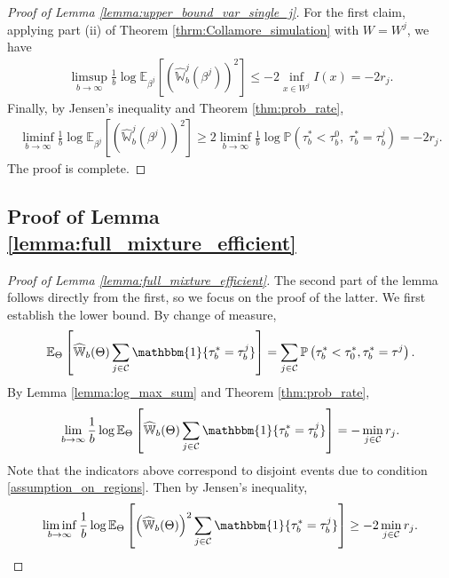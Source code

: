 \documentclass[aap,preprint]{imsart}
\newcommand{\Pro}{{\mathbb{P}}}
\newcommand{\Exp}{{\mathbb{E}}}
\theoremstyle{plain}
\theoremstyle{definition}
\begin{document}
\begin{appendix}
\begin{proof}[Proof of Lemma \ref{lemma:upper_bound_var_single_j}]
For the first claim, applying part (ii) of Theorem \ref{thrm:Collamore_simulation} with $W = W^j$, we have
\begin{align*}
    \limsup_{b \to \infty} \frac{1}{b} \log \Exp_{\beta^j}\left[ 
\left(\widehat{\mathbb{W}}_{b}^{j}(\beta^j)\right)^2
\right]  \leq -2 \inf_{x \in W^j} I(x) = -2r_j.
\end{align*}
Finally, by Jensen's inequality and Theorem \ref{thm:prob_rate},
\begin{align*}
    \liminf_{b \to \infty} \frac{1}{b} \log \Exp_{\beta^j}\left[ 
\left(\widehat{\mathbb{W}}_{b}^{j}(\beta^j)\right)^2
\right]  \geq  2 \liminf_{b \to \infty}   \frac{1}{b} \log \Pro\left(\tau_b^* < \tau_b^0,\; \tau_b^* = \tau_b^j \right) = -2 r_j.
\end{align*}
The proof is complete.
\end{proof}

\subsection{Proof of Lemma \ref{lemma:full_mixture_efficient}}\label{app:proof_full_mixture}
\begin{proof}[Proof of Lemma \ref{lemma:full_mixture_efficient}]
The second part of the lemma follows directly from the first, so we focus on the proof of the latter.
We first establish the lower bound. By change of measure,
\begin{align*}
\Exp_{\Theta}\left[ \widehat{\mathbb{W}}_{b}(\Theta) \sum_{j \in \mathcal{C}} \mathbbm{1}\{\tau_b^* = \tau_b^j\}\right] = \sum_{j \in \mathcal{C}}\Pro\left(\tau_b^* < \tau_0^*, \tau_b^* = \tau^j \right).
\end{align*}
By Lemma \ref{lemma:log_max_sum} and  Theorem \ref{thm:prob_rate},
\begin{align*}
\lim_{b\to \infty} \frac{1}{b} \log  \Exp_{\Theta}\left[ \widehat{\mathbb{W}}_{b}(\Theta) \sum_{j \in \mathcal{C}} \mathbbm{1}\{\tau_b^* = \tau_b^j\}\right] = -\min_{j \in \mathcal{C}} r_j.
\end{align*}
Note that the indicators above correspond to disjoint events due to condition \eqref{assumption_on_regions}. Then by Jensen's inequality, 
\begin{align*}
        \liminf_{b\to \infty} \frac{1}{b} \log  \Exp_{\Theta}\left[ \left(\widehat{\mathbb{W}}_{b}(\Theta) \right)^2 \sum_{j \in \mathcal{C}} \mathbbm{1}\{\tau_b^* = \tau_b^j\}\right] \geq -2 \min_{j \in \mathcal{C}} r_j.
\end{align*}


\end{proof}
\end{appendix}
\end{document}
